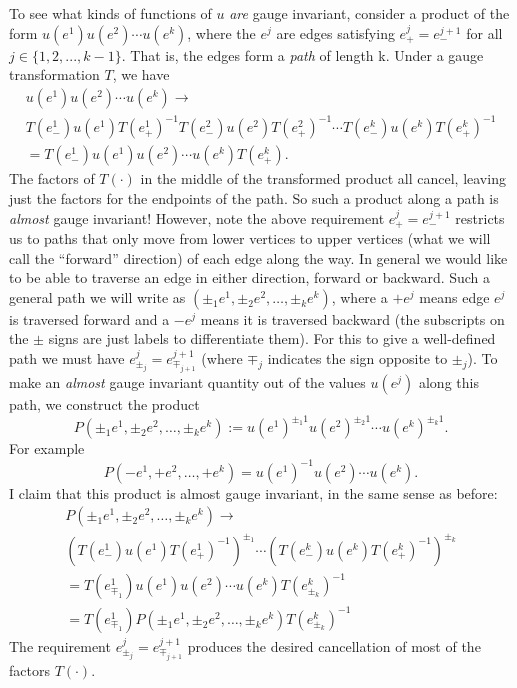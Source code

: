 \documentclass[9pt,twocolumn,twoside]{article}
\begin{document}
To see what kinds of functions of $u$ \textit{are} gauge invariant, consider a product of the form $u(e^1)u(e^2)\cdots u(e^k)$, where the $e^j$ are edges satisfying $e_+^j=e_-^{j+1}$ for all $j\in\{1,2,...,k-1\}$.  That is, the edges form a \textit{path} of length k.  Under a gauge transformation $T$, we have 
\begin{multline*}
u(e^1)u(e^2)\cdots u(e^k) \rightarrow  \\
T(e_-^1)u(e^1)T(e_+^1)^{-1} T(e_-^2)u(e^2)T(e_+^2)^{-1} \cdots T(e_-^k)u(e^k)T(e_+^k)^{-1} \\ 
=  T(e_-^1)u(e^1)u(e^2)\cdots u(e^k)T(e_+^k). 
\end{multline*}
The factors of $T(\cdot)$ in the middle of the transformed product all cancel, leaving just the factors for the endpoints of the path.  So such a product along a path is \textit{almost} gauge invariant!  However, note the above requirement $e_+^j=e_-^{j+1}$ restricts us to paths that only move from lower vertices to upper vertices (what we will call the ``forward'' direction) of each edge along the way.  In general we would like to be able to traverse an edge in either direction, forward or backward.  Such a general path we will write as $(\pm_1 e^1, \pm_2 e^2, \dots , \pm_k e^k)$, where a $+e^j$ means edge $e^j$ is traversed forward and a $-e^j$ means it is traversed backward (the subscripts on the $\pm$ signs are just labels to differentiate them).  For this to give a well-defined path we must have $e^j_{\pm_j} = e^{j+1}_{\mp_{j+1}}$ (where $\mp_j$ indicates the sign opposite to $\pm_j$).  To make an \textit{almost} gauge invariant quantity out of the values $u(e^j)$ along this path, we construct the product 
\[P(\pm_1 e^1, \pm_2 e^2, \dots , \pm_k e^k) := u(e^1)^{\pm_1 1} u(e^2)^{\pm_2 1} \cdots u(e^k)^{\pm_k 1}.\]
For example 
\[P(-e^1,+e^2,\dots,+e^k) = u(e^1)^{-1} u(e^2)\cdots u(e^k).\]
I claim that this product is almost gauge invariant, in the same sense as before:
\begin{multline*}
P(\pm_1 e^1,\pm_2 e^2,\dots,\pm_k e^k) \rightarrow \\
\left(T(e_-^1)u(e^1)T(e_+^1)^{-1}\right)^{\pm_1} \cdots \left(T(e_-^k)u(e^k)T(e_+^k)^{-1}\right)^{\pm_k} \\
= T(e_{\mp_1}^1) u(e^1) u(e^2) \cdots u(e^k) T(e_{\pm_k}^k)^{-1} \\
= T(e_{\mp_1}^1) P(\pm_1 e^1,\pm_2 e^2,\dots,\pm_k e^k) T(e_{\pm_k}^k)^{-1}
\end{multline*}
The requirement $e^j_{\pm_j} = e^{j+1}_{\mp_{j+1}}$ produces the desired cancellation of most of the factors $T(\cdot)$.  
\end{document}
